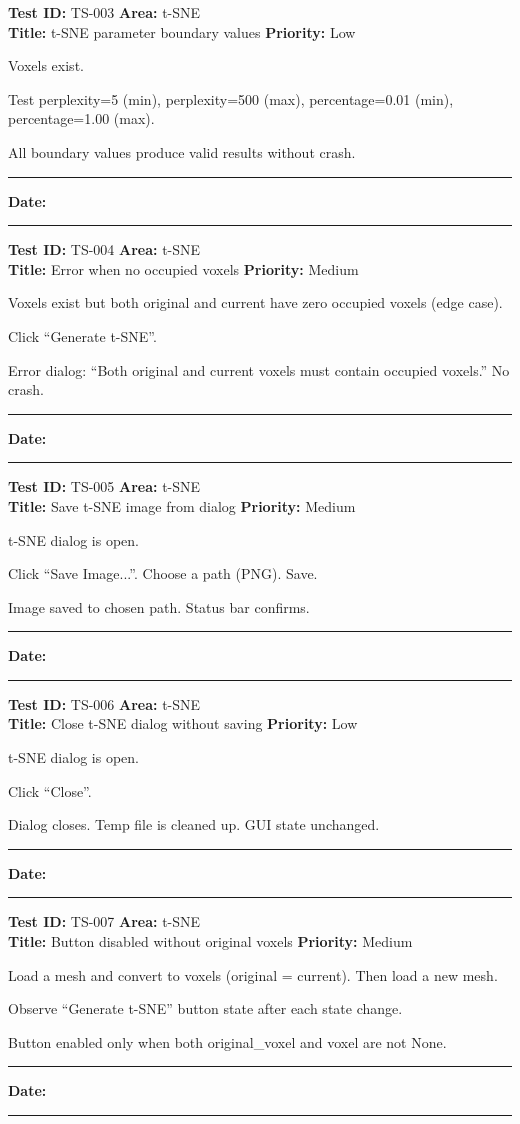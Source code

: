 \documentclass[12pt,a4paper]{article}
\newenvironment{testcase}[4]{%
  \smallskip
  \noindent\textbf{Test ID:} #1 \hfill \textbf{Area:} #2 \\
  \textbf{Title:} #3 \hfill \textbf{Priority:} #4
  \begin{description}[leftmargin=2em,style=nextline]
    \item[\textbf{Preconditions:}]
}{%
    \item[\textbf{Steps:}]
    \item[\textbf{Expected Result:}]
    \item[\textbf{Status:}] \rule{3cm}{0.4pt} \hspace{1em} \textbf{Date:} \rule{3cm}{0.4pt}
    \item[\textbf{Notes:}]
  \end{description}
  \smallskip
}
\begin{document}
\begin{testcase}{TS-003}{t-SNE}{t-SNE parameter boundary values}{Low}
  \item Voxels exist.
  \item Test perplexity=5 (min), perplexity=500 (max), percentage=0.01 (min), percentage=1.00 (max).
  \item All boundary values produce valid results without crash.
\end{testcase}

\begin{testcase}{TS-004}{t-SNE}{Error when no occupied voxels}{Medium}
  \item Voxels exist but both original and current have zero occupied voxels (edge case).
  \item Click ``Generate t-SNE''.
  \item Error dialog: ``Both original and current voxels must contain occupied voxels.'' No crash.
\end{testcase}

\begin{testcase}{TS-005}{t-SNE}{Save t-SNE image from dialog}{Medium}
  \item t-SNE dialog is open.
  \item Click ``Save Image...''. Choose a path (PNG). Save.
  \item Image saved to chosen path. Status bar confirms.
\end{testcase}

\begin{testcase}{TS-006}{t-SNE}{Close t-SNE dialog without saving}{Low}
  \item t-SNE dialog is open.
  \item Click ``Close''.
  \item Dialog closes. Temp file is cleaned up. GUI state unchanged.
\end{testcase}

\begin{testcase}{TS-007}{t-SNE}{Button disabled without original voxels}{Medium}
  \item Load a mesh and convert to voxels (original = current). Then load a new mesh.
  \item Observe ``Generate t-SNE'' button state after each state change.
  \item Button enabled only when both original\_voxel and voxel are not None.
\end{testcase}

\end{document}
